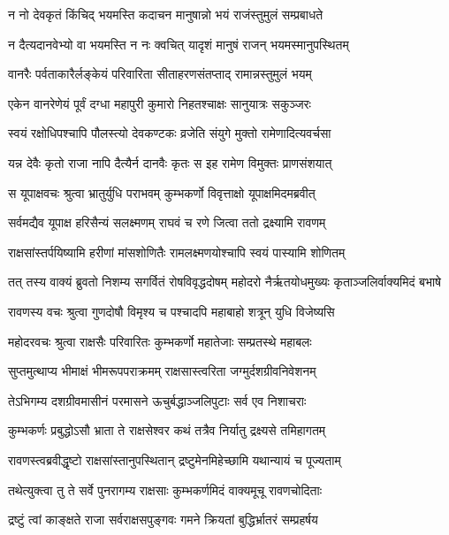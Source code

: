 \twolineshloka
{न नो देवकृतं किंचिद् भयमस्ति कदाचन}
{मानुषान्नो भयं राजंस्तुमुलं सम्प्रबाधते} %

\twolineshloka
{न दैत्यदानवेभ्यो वा भयमस्ति न नः क्वचित्}
{यादृशं मानुषं राजन् भयमस्मानुपस्थितम्} %

\twolineshloka
{वानरैः पर्वताकारैर्लङ्केयं परिवारिता}
{सीताहरणसंतप्ताद् रामान्नस्तुमुलं भयम्} %

\twolineshloka
{एकेन वानरेणेयं पूर्वं दग्धा महापुरी}
{कुमारो निहतश्चाक्षः सानुयात्रः सकुञ्जरः} %

\twolineshloka
{स्वयं रक्षोधिपश्चापि पौलस्त्यो देवकण्टकः}
{व्रजेति संयुगे मुक्तो रामेणादित्यवर्चसा} %

\twolineshloka
{यन्न देवैः कृतो राजा नापि दैत्यैर्न दानवैः}
{कृतः स इह रामेण विमुक्तः प्राणसंशयात्} %

\twolineshloka
{स यूपाक्षवचः श्रुत्वा भ्रातुर्युधि पराभवम्}
{कुम्भकर्णो विवृत्ताक्षो यूपाक्षमिदमब्रवीत्} %

\twolineshloka
{सर्वमद्यैव यूपाक्ष हरिसैन्यं सलक्ष्मणम्}
{राघवं च रणे जित्वा ततो द्रक्ष्यामि रावणम्} %

\twolineshloka
{राक्षसांस्तर्पयिष्यामि हरीणां मांसशोणितैः}
{रामलक्ष्मणयोश्चापि स्वयं पास्यामि शोणितम्} %

\twolineshloka
{तत् तस्य वाक्यं ब्रुवतो निशम्य सगर्वितं रोषविवृद्धदोषम्}
{महोदरो नैर्ऋतयोधमुख्यः कृताञ्जलिर्वाक्यमिदं बभाषे} %

\twolineshloka
{रावणस्य वचः श्रुत्वा गुणदोषौ विमृश्य च}
{पश्चादपि महाबाहो शत्रून् युधि विजेष्यसि} %

\twolineshloka
{महोदरवचः श्रुत्वा राक्षसैः परिवारितः}
{कुम्भकर्णो महातेजाः सम्प्रतस्थे महाबलः} %

\twolineshloka
{सुप्तमुत्थाप्य भीमाक्षं भीमरूपपराक्रमम्}
{राक्षसास्त्वरिता जग्मुर्दशग्रीवनिवेशनम्} %

\twolineshloka
{तेऽभिगम्य दशग्रीवमासीनं परमासने}
{ऊचुर्बद्धाञ्जलिपुटाः सर्व एव निशाचराः} %

\twolineshloka
{कुम्भकर्णः प्रबुद्धोऽसौ भ्राता ते राक्षसेश्वर}
{कथं तत्रैव निर्यातु द्रक्ष्यसे तमिहागतम्} %

\twolineshloka
{रावणस्त्वब्रवीद्धृष्टो राक्षसांस्तानुपस्थितान्}
{द्रष्टुमेनमिहेच्छामि यथान्यायं च पूज्यताम्} %

\twolineshloka
{तथेत्युक्त्वा तु ते सर्वे पुनरागम्य राक्षसाः}
{कुम्भकर्णमिदं वाक्यमूचू रावणचोदिताः} %

\twolineshloka
{द्रष्टुं त्वां काङ्क्षते राजा सर्वराक्षसपुङ्गवः}
{गमने क्रियतां बुद्धिर्भ्रातरं सम्प्रहर्षय} %

